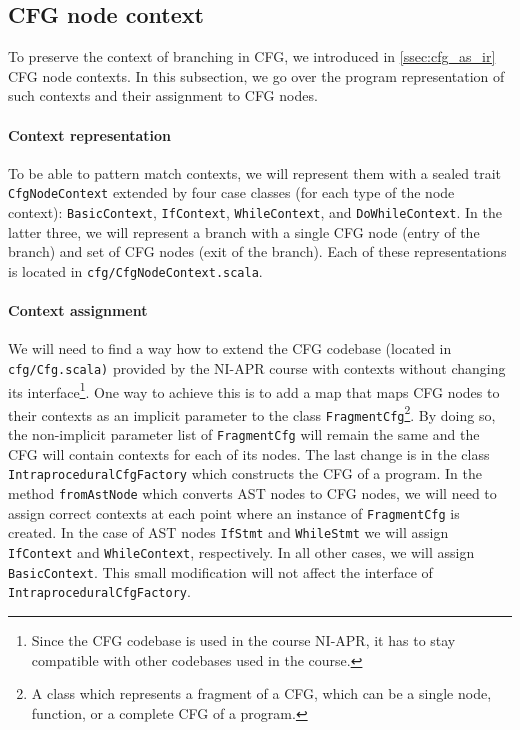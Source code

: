\documentclass[thesis=M,english]{FITthesis}[2019/12/23]
\begin{document}
\subsection{CFG node context}\label{ssec:cfg_context}
To preserve the context of branching in CFG, we introduced in \autoref{ssec:cfg_as_ir} CFG node contexts. In this subsection, we go over the program representation of such contexts and their assignment to CFG nodes.

\paragraph*{Context representation} To be able to pattern match contexts, we will represent them with a sealed trait \texttt{CfgNodeContext} extended by four case classes (for each type of the node context): \texttt{BasicContext}, \texttt{IfContext}, \texttt{WhileContext}, and \texttt{DoWhileContext}. In the latter three, we will represent a branch with a single CFG node (entry of the branch) and set of CFG nodes (exit of the branch). Each of these representations is located in \texttt{cfg/CfgNodeContext.scala}.

\paragraph*{Context assignment} We will need to find a way how to extend the CFG codebase (located in \texttt{cfg/Cfg.scala)} provided by the NI-APR course with contexts without changing its interface\footnote{Since the CFG codebase is used in the course NI-APR, it has to stay compatible with other codebases used in the course.}. One way to achieve this is to add a map that maps CFG nodes to their contexts as an implicit parameter to the class \texttt{FragmentCfg}\footnote{A class which represents a fragment of a CFG, which can be a single node, function, or a complete CFG of a program.}. By doing so, the non-implicit parameter list of \texttt{FragmentCfg} will remain the same and the CFG will contain contexts for each of its nodes. The last change is in the class \texttt{IntraproceduralCfgFactory} which constructs the CFG of a program. In the method \texttt{fromAstNode} which converts AST nodes to CFG nodes, we will need to assign correct contexts at each point where an instance of \texttt{FragmentCfg} is created. In the case of AST nodes \texttt{IfStmt} and \texttt{WhileStmt} we will assign \texttt{IfContext} and \texttt{WhileContext}, respectively. In all other cases, we will assign \texttt{BasicContext}. This small modification will not affect the interface of \texttt{IntraproceduralCfgFactory}.
\end{document}

